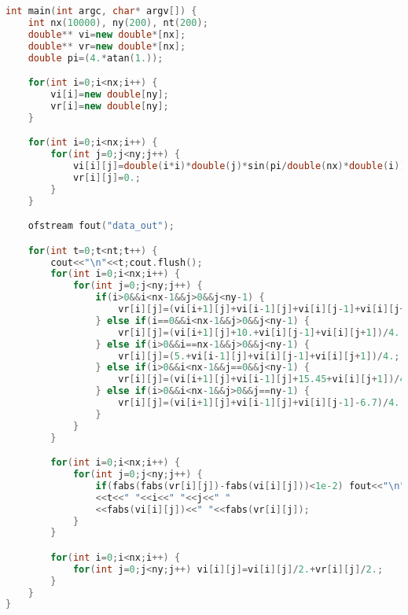 \documentclass[12pt]{report}
\begin{document}
\begin{lstlisting}[language=C++, caption=Original code listing]
int main(int argc, char* argv[]) {
    int nx(10000), ny(200), nt(200);
    double** vi=new double*[nx];
    double** vr=new double*[nx];
    double pi=(4.*atan(1.));

    for(int i=0;i<nx;i++) {
        vi[i]=new double[ny];
        vr[i]=new double[ny];
    }

    for(int i=0;i<nx;i++) {
        for(int j=0;j<ny;j++) {
            vi[i][j]=double(i*i)*double(j)*sin(pi/double(nx)*double(i));
            vr[i][j]=0.;
        }
    }

    ofstream fout("data_out");

    for(int t=0;t<nt;t++) {
        cout<<"\n"<<t;cout.flush();
        for(int i=0;i<nx;i++) {
            for(int j=0;j<ny;j++) {
                if(i>0&&i<nx-1&&j>0&&j<ny-1) {
                    vr[i][j]=(vi[i+1][j]+vi[i-1][j]+vi[i][j-1]+vi[i][j+1])/4.;
                } else if(i==0&&i<nx-1&&j>0&&j<ny-1) {
                    vr[i][j]=(vi[i+1][j]+10.+vi[i][j-1]+vi[i][j+1])/4.;
                } else if(i>0&&i==nx-1&&j>0&&j<ny-1) {
                    vr[i][j]=(5.+vi[i-1][j]+vi[i][j-1]+vi[i][j+1])/4.;
                } else if(i>0&&i<nx-1&&j==0&&j<ny-1) {
                    vr[i][j]=(vi[i+1][j]+vi[i-1][j]+15.45+vi[i][j+1])/4.;
                } else if(i>0&&i<nx-1&&j>0&&j==ny-1) {
                    vr[i][j]=(vi[i+1][j]+vi[i-1][j]+vi[i][j-1]-6.7)/4.;
                }
            }
        }

        for(int i=0;i<nx;i++) {
            for(int j=0;j<ny;j++) {
                if(fabs(fabs(vr[i][j])-fabs(vi[i][j]))<1e-2) fout<<"\n"
                <<t<<" "<<i<<" "<<j<<" "
                <<fabs(vi[i][j])<<" "<<fabs(vr[i][j]);
            }
        }

        for(int i=0;i<nx;i++) {
            for(int j=0;j<ny;j++) vi[i][j]=vi[i][j]/2.+vr[i][j]/2.;
        }
    }
}
\end{lstlisting}
\end{document}
